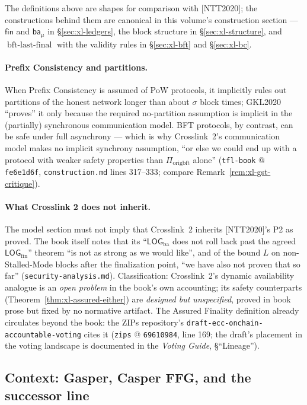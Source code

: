 \documentclass[11pt,a4paper]{article}
\theoremstyle{definition}
\begin{document}
The definitions above are shapes for comparison with [NTT2020]; the
constructions behind them are canonical in this volume's construction
section --- $\mathsf{fin}$ and $\mathsf{ba}_{\mu}$ in
\S\ref{sec:xl-ledgers}, the block structure in \S\ref{sec:xl-structure},
and $\operatorname{bft\text{-}last\text{-}final}$ with the validity
rules in \S\ref{sec:xl-bft} and \S\ref{sec:xl-bc}.

\paragraph{Prefix Consistency and partitions.} When Prefix Consistency is
assumed of PoW protocols, it implicitly rules out partitions of the honest
network longer than about $\sigma$ block times; GKL2020 ``proves'' it only
because the required no-partition assumption is implicit in the
(partially) synchronous communication model. BFT protocols, by contrast,
can be safe under full asynchrony --- which is why Crosslink~2's
communication model makes no implicit synchrony assumption, ``or else we
could end up with a protocol with weaker safety properties than
$\Pi_{\mathrm{origbft}}$ alone'' (\texttt{tfl-book} @ \texttt{fe6e1d6f},
\texttt{construction.md} lines 317--333; compare
Remark~\ref{rem:xl-gst-critique}).

\paragraph{What Crosslink 2 does not inherit.} The model section must not
imply that Crosslink~2 inherits [NTT2020]'s P2 as proved. The book itself
notes that its ``$\mathsf{LOG}_{\mathrm{ba}}$ does not roll back past the
agreed $\mathsf{LOG}_{\mathrm{fin}}$'' theorem ``is not as strong as we
would like'', and of the bound $L$ on non-Stalled-Mode blocks after the
finalization point, ``we have also not proven that so far''
(\texttt{security-analysis.md}). Classification: Crosslink~2's dynamic
availability analogue is an \emph{open problem} in the book's own
accounting; its safety counterparts
(Theorem~\ref{thm:xl-assured-either}) are \emph{designed but
unspecified}, proved in book prose but fixed by no normative artifact.
The Assured Finality definition already circulates beyond the book: the
ZIPs repository's \texttt{draft-ecc-onchain-accountable-voting} cites it
(\texttt{zips} @ \texttt{69610984}, line 169; the draft's placement in
the voting landscape is documented in the \emph{Voting Guide},
\S``Lineage'').

\subsection{Context: Gasper, Casper FFG, and the successor line}
\label{sec:xl-model-context}
\end{document}
